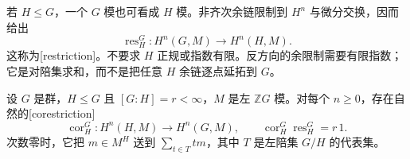若 \(H\le G\)，一个 \(G\) 模也可看成 \(H\) 模。非齐次余链限制到 \(H^n\) 与微分交换，因而给出
\[
	\operatorname{res}_H^G:H^n(G,M)\longrightarrow H^n(H,M).
\]
这称为[restriction]。不要求 \(H\) 正规或指数有限。反方向的余限制需要有限指数；它是对陪集求和，而不是把任意 \(H\) 余链逐点延拓到 \(G\)。

\begin{proposition}\label{b4:prop:group-corestriction}
	设 \(G\) 是群，\(H\le G\) 且 \([G:H]=r<\infty\)，\(M\) 是左 \(\mathbb ZG\) 模。对每个 \(n\ge0\)，存在自然的[corestriction]
	\[
		\operatorname{cor}_H^G:H^n(H,M)\longrightarrow H^n(G,M), \qquad \operatorname{cor}_H^G\operatorname{res}_H^G=r\,1.
	\]
	次数零时，它把 \(m\in M^H\) 送到 \(\sum_{t\in T}tm\)，其中 \(T\) 是左陪集 \(G/H\) 的代表集。
\end{proposition}

